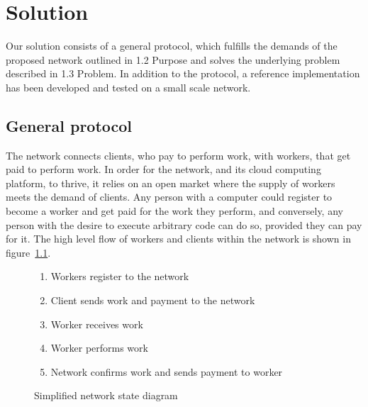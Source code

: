 \chapter{Solution}
Our solution consists of a general protocol, which fulfills the demands of the proposed network outlined in 1.2 Purpose and solves the underlying problem described in 1.3 Problem.
In addition to the protocol, a reference implementation has been developed and tested on a small scale network.

\section{General protocol}
The network connects clients, who pay to perform work, with workers, that get paid to perform work. In order for the network, and its cloud computing platform, to thrive, it relies on an open market where the supply of workers meets the demand of clients. Any person with a computer could register to become a worker and get paid for the work they perform, and conversely, any person with the desire to execute arbitrary code can do so, provided they can pay for it. The high level flow of workers and clients within the network is shown in figure~\ref{network-schema}.

\begin{figure}[ht]
\centering
{}

\begin{enumerate}
\item Workers register to the network
\item Client sends work and payment to the network
\item Worker receives work
\item Worker performs work
\item Network confirms work and sends payment to worker
\end{enumerate}
\caption{Simplified network state diagram}
\label{network-schema}
\end{figure}

